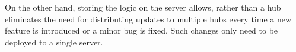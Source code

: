 On the other hand, storing the logic on the server allows, 
rather than a hub eliminates the need for distributing updates to multiple hubs every time a new feature is introduced or a minor bug is fixed. 
Such changes only need to be deployed to a single server.

